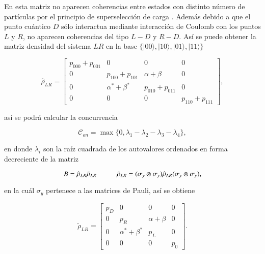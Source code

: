 \begin{appendixs}
En esta matriz no aparecen coherencias entre estados con distinto número de partículas por el principio de superselección de carga \cite{bartlett2007reference,wick1997intrinsic}. Además debido a que el punto cuántico $D$ sólo interactua mediante interacción de Coulomb con los puntos $L$ y $R$, no aparecen coherencias del tipo $L-D$ y $R-D$. Así se puede obtener la matriz densidad del sistema $LR$ en la base $\{|00\rangle, |10\rangle, |01\rangle, |11\rangle \}$

\begin{equation*}
    \hat{\rho}_{LR} = 
    \begin{bmatrix}
        p_{000}+p_{001} & 0 & 0 & 0  \\
        0 & p_{100} + p_{101} & \alpha + \beta & 0  \\
        0 & \alpha^{*} +\beta^{*} & p_{010} + p_{011} & 0  \\
        0 & 0 & 0 & p_{110} + p_{111} 
        \end{bmatrix},
\end{equation*}

así se podrá calcular la concurrencia 

\begin{equation*}
    \mathcal{C}_{on} = \max \{ 0,\lambda_{1} - \lambda_{2} - \lambda_{3} - \lambda_{4} \},
\end{equation*}

en donde $\lambda_{i}$ son la raíz cuadrada de los autovalores ordenados en forma decreciente de la matriz

\begin{equation*}
    B = \hat{\rho}_{LR} \tilde{\rho}_{LR} \hspace{10mm} \tilde{\rho}_{LR} = (\sigma_{y} \otimes \sigma_{y}) \hat{\rho}_{LR} (\sigma_{y} \otimes \sigma_{y}),
\end{equation*}

en la cuál $\sigma_{y}$ pertenece a las matrices de Pauli, así se obtiene

\begin{equation*}
    \tilde{\rho}_{LR} = 
    \begin{bmatrix}
        p_{D} & 0 & 0 & 0  \\
        0 & p_{R} & \alpha + \beta & 0  \\
        0 & \alpha^{*} +\beta^{*} & p_{L} & 0  \\
        0 & 0 & 0 & p_{0} 
        \end{bmatrix}.
\end{equation*}


\end{appendixs}
